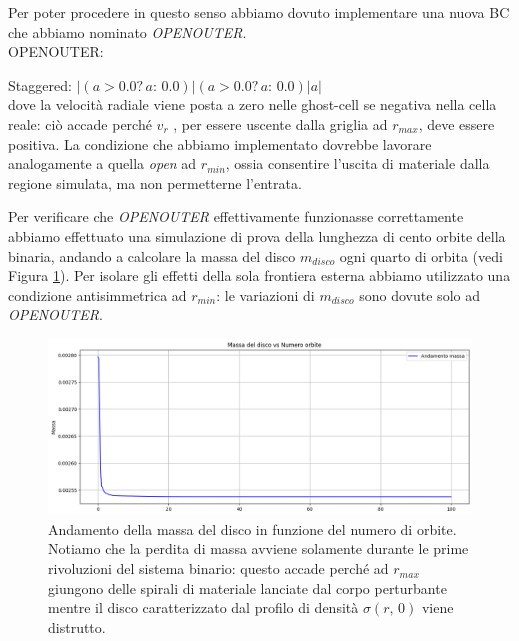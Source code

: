 Per poter procedere in questo senso abbiamo dovuto implementare una nuova BC che abbiamo nominato \textit{OPENOUTER}.\\

OPENOUTER:

\hspace{2cm} Staggered: $|(a>0.0?\,a:\,0.0)|(a>0.0?\,a:\,0.0)|a|$\\

dove la velocità radiale viene posta a zero nelle ghost-cell se negativa nella cella reale: ciò accade perché $v_r$ , per essere uscente dalla griglia ad $r_{max}$, deve essere positiva. La condizione che abbiamo implementato dovrebbe lavorare analogamente a quella \textit{open} ad $r_{min}$, ossia consentire l'uscita di materiale dalla regione simulata, ma non permetterne l'entrata.

Per verificare che \textit{OPENOUTER} effettivamente funzionasse correttamente abbiamo effettuato una simulazione di prova della lunghezza di cento orbite della binaria, andando a calcolare la massa del disco $m_{disco}$ ogni quarto di orbita (vedi Figura \ref{fig:test_openouter}). 
Per isolare gli effetti della sola frontiera esterna abbiamo utilizzato una condizione antisimmetrica ad $r_{min}$: le variazioni di $m_{disco}$ sono dovute solo ad \textit{OPENOUTER}.\\

\begin{figure}[h]
    \centering
    \includegraphics[width=\textwidth]{Immagini/Simulazioni/TestOpenouter.png}
    \caption{Andamento della massa del disco in funzione del numero di orbite. Notiamo che la perdita di massa avviene solamente durante le prime rivoluzioni del sistema binario: questo accade perché ad $r_{max}$ giungono delle spirali di materiale lanciate dal corpo perturbante mentre il disco caratterizzato dal profilo di densità $\sigma(r,\,0)$ viene distrutto.}
    \label{fig:test_openouter}
\end{figure}

